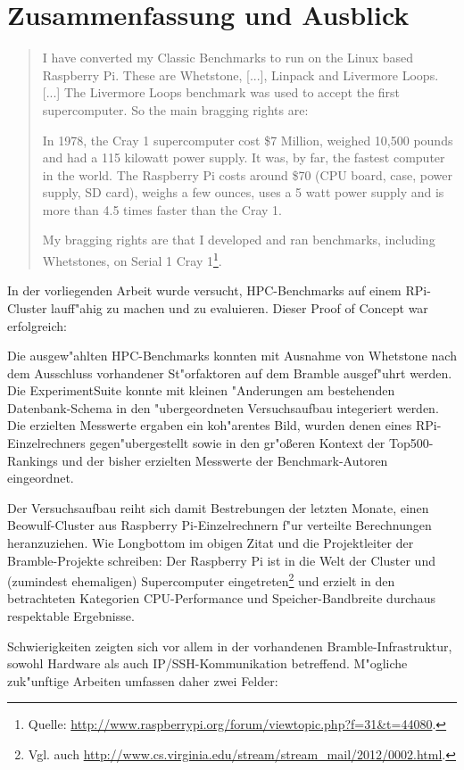 \chapter{Zusammenfassung und Ausblick}\label{Kap5}
\begin{quote}
\onehalfspacing
I have converted my Classic Benchmarks to run on the Linux based Raspberry Pi. These are Whetstone, [...], Linpack and Livermore Loops. [...] The Livermore Loops benchmark was used to accept the first supercomputer. So the main bragging rights are:

In 1978, the Cray 1 supercomputer cost \$7 Million, weighed 10,500 pounds and had a 115 kilowatt power supply. It was, by far, the fastest computer in the world. The Raspberry Pi costs around \$70 (CPU board, case, power supply, SD card), weighs a few ounces, uses a 5 watt power supply and is more than 4.5 times faster than the Cray 1. 

My bragging rights are that I developed and ran benchmarks, including Whetstones, on Serial 1 Cray 1\footnote{Quelle: \url{http://www.raspberrypi.org/forum/viewtopic.php?f=31&t=44080}.}.
\end{quote}

In der vorliegenden Arbeit wurde versucht, HPC-Benchmarks auf einem RPi-Cluster lauff"ahig zu machen und zu evaluieren. Dieser Proof of Concept war erfolgreich: 

Die ausgew"ahlten HPC-Benchmarks konnten mit Ausnahme von Whetstone nach dem Ausschluss vorhandener St"orfaktoren auf dem Bramble ausgef"uhrt werden. Die ExperimentSuite konnte mit kleinen "Anderungen am bestehenden Datenbank-Schema in den "ubergeordneten Versuchsaufbau integeriert werden. Die erzielten Messwerte ergaben ein koh"arentes Bild, wurden denen eines RPi-Einzelrechners gegen"ubergestellt sowie in den gr"o\ss eren Kontext der Top500-Rankings und der bisher erzielten Messwerte der Benchmark-Autoren eingeordnet. 

Der Versuchsaufbau reiht sich damit Bestrebungen der letzten Monate, einen Beowulf-Cluster aus Raspberry Pi-Einzelrechnern f"ur verteilte Berechnungen heranzuziehen. Wie Longbottom im obigen Zitat und die Projektleiter der Bramble-Projekte schreiben: Der Raspberry Pi ist in die Welt der Cluster und (zumindest ehemaligen) Supercomputer eingetreten\footnote{Vgl. auch \url{http://www.cs.virginia.edu/stream/stream_mail/2012/0002.html}.} und erzielt in den betrachteten Kategorien CPU-Performance und Speicher-Band\-breite durchaus respektable Ergebnisse. 

Schwierigkeiten zeigten sich vor allem in der vorhandenen Bramble-Infrastruktur, sowohl Hardware als auch IP/SSH-Kommunikation betreffend. M"ogliche zuk"unftige Arbeiten umfassen daher zwei Felder: 


